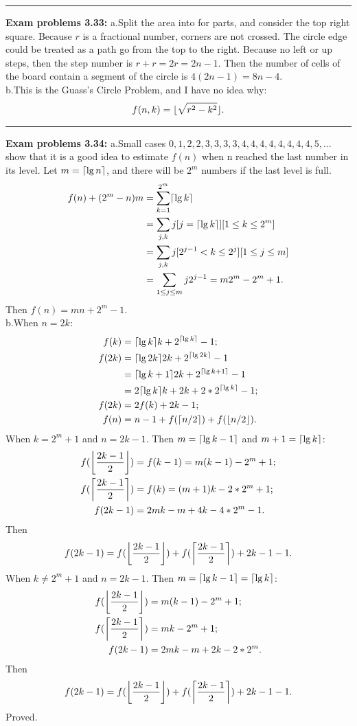 \documentclass{article}
\DeclarePairedDelimiter\ceil{\lceil}{\rceil}
\DeclarePairedDelimiter\floor{\lfloor}{\rfloor}
\begin{document}
\noindent\rule{\textwidth}{0.4pt}
\textbf{Exam problems 3.33:}
a.Split the area into for parts, and consider the top right square.
Because $r$ is a fractional number, corners are not crossed.
The circle edge could be treated as a path go from the top to the right.
Because no left or up steps, then the step number is $r + r = 2r = 2n-1$.
Then the number of cells of the board contain a segment of the circle is $4(2n-1) = 8n-4$. \\
b.This is the Guass's Circle Problem, and I have no idea why:
\begin{align}
f(n,k) = \floor{\sqrt{r^2 - k^2}}.
\end{align}

\noindent\rule{\textwidth}{0.4pt}
\textbf{Exam problems 3.34:}
a.Small cases $0,1,2,2,3,3,3,3,4,4,4,4,4,4,4,4,5, ...$ show that it is a good idea to estimate $f(n)$ when n reached the last number in its level.
Let $m = \ceil{\lg{n}}$, and there will be $2^m$ numbers if the last level is full.
\begin{align}
f(n) + (2^m - n)m &= \sum_{k=1}^{2^m} \ceil{\lg{k}} \\
		  &= \sum_{j,k} j[j = \ceil{\lg{k}}][1 \le k \le 2^m] \\
		  &= \sum_{j,k} j[2^{j-1} < k \le 2^j][1 \le j \le m] \\
		  &= \sum_{1 \le j \le m} j2^{j-1} = m2^m - 2^m + 1.
\end{align}
Then $f(n) = mn + 2^m - 1$.\\
b.When $n = 2k$:
\begin{align}
f(k) &= \ceil{\lg{k}}k + 2^{\ceil{\lg{k}}} - 1;\\
f(2k) &= \ceil{\lg{2k}}2k + 2^{\ceil{\lg{2k}}} - 1 \\
      &= \ceil{\lg{k}+1}2k + 2^{\ceil{\lg{k}+1}} - 1 \\
      &= 2\ceil{\lg{k}}k + 2k + 2*2^{\ceil{\lg{k}}} - 1;\\
f(2k) &= 2f(k) + 2k - 1;\\
f(n)  &= n - 1 + f(\ceil{n/2}) + f(\floor{n/2}).
\end{align}
When $k = 2^m + 1$ and $n = 2k -1$.
Then $m = \ceil{\lg{k-1}}$ and $m + 1 = \ceil{\lg{k}}$:
\begin{align}
f(\floor*{\frac{2k-1}{2}}) &= f(k-1) = m(k-1)-2^m +1;\\
f(\ceil*{\frac{2k-1}{2}}) &= f(k) = (m+1)k-2*2^m +1;\\
f(2k-1) &= 2mk-m+4k-4*2^m-1.
\end{align}
Then 
\begin{align}
f(2k-1) = f(\floor*{\frac{2k-1}{2}}) + f(\ceil*{\frac{2k-1}{2}}) + 2k-1 -1.
\end{align}
When $k \neq 2^m + 1$ and $n = 2k -1$.
Then $m = \ceil{\lg{k-1}} = \ceil{\lg{k}}$:
\begin{align}
f(\floor*{\frac{2k-1}{2}}) &= m(k-1)-2^m + 1;\\
f(\ceil*{\frac{2k-1}{2}}) &= mk - 2^m + 1;\\
f(2k-1) &= 2mk-m+2k-2*2^m.
\end{align}
Then 
\begin{align}
f(2k-1) = f(\floor*{\frac{2k-1}{2}}) + f(\ceil*{\frac{2k-1}{2}}) + 2k-1 -1.
\end{align}
Proved.
\end{document}
